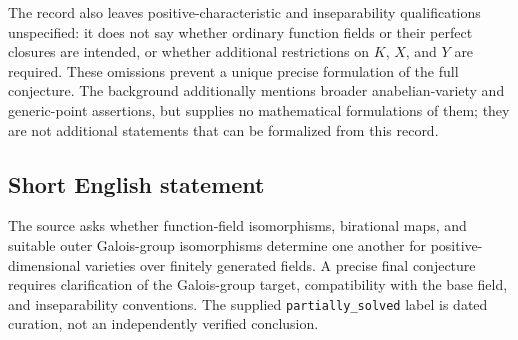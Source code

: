 \documentclass[11pt]{article}
\begin{document}
The record also leaves positive-characteristic and inseparability qualifications unspecified: it does not say whether ordinary function fields or their perfect closures are intended, or whether additional restrictions on \(K\), \(X\), and \(Y\) are required. These omissions prevent a unique precise formulation of the full conjecture. The background additionally mentions broader anabelian-variety and generic-point assertions, but supplies no mathematical formulations of them; they are not additional statements that can be formalized from this record.
\subsection{Short English statement}
The source asks whether function-field isomorphisms, birational maps, and suitable outer Galois-group isomorphisms determine one another for positive-dimensional varieties over finitely generated fields. A precise final conjecture requires clarification of the Galois-group target, compatibility with the base field, and inseparability conventions. The supplied \texttt{partially\_solved} label is dated curation, not an independently verified conclusion.
\end{document}
